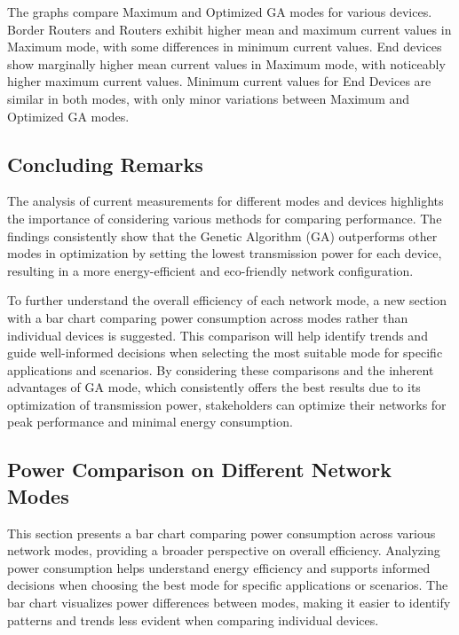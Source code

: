 The graphs compare Maximum and Optimized GA modes for various devices. Border Routers and Routers exhibit higher mean and maximum current values in Maximum mode, with some differences in minimum current values. End devices show marginally higher mean current values in Maximum mode, with noticeably higher maximum current values. Minimum current values for End Devices are similar in both modes, with only minor variations between Maximum and Optimized GA modes.

\subsection{Concluding Remarks}
The analysis of current measurements for different modes and devices highlights the importance of considering various methods for comparing performance. The findings consistently show that the Genetic Algorithm (GA) outperforms other modes in optimization by setting the lowest transmission power for each device, resulting in a more energy-efficient and eco-friendly network configuration.

To further understand the overall efficiency of each network mode, a new section with a bar chart comparing power consumption across modes rather than individual devices is suggested. This comparison will help identify trends and guide well-informed decisions when selecting the most suitable mode for specific applications and scenarios. By considering these comparisons and the inherent advantages of GA mode, which consistently offers the best results due to its optimization of transmission power, stakeholders can optimize their networks for peak performance and minimal energy consumption.

\subsection{Power Comparison on Different Network Modes}
This section presents a bar chart comparing power consumption across various network modes, providing a broader perspective on overall efficiency. Analyzing power consumption helps understand energy efficiency and supports informed decisions when choosing the best mode for specific applications or scenarios. The bar chart visualizes power differences between modes, making it easier to identify patterns and trends less evident when comparing individual devices.

